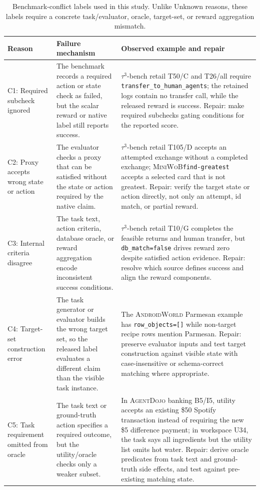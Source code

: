 \documentclass{article}
\newcommand{\agentdojo}{\textsc{AgentDojo}\xspace}
\newcommand{\tauthree}{\(\tau^3\)-bench retail\xspace}
\newcommand{\androidworld}{\textsc{AndroidWorld}\xspace}
\newcommand{\miniwob}{\textsc{MiniWoB}\xspace}
\begin{document}
\begin{table}[h]
\centering
\caption{Benchmark-conflict labels used in this study. Unlike Unknown reasons,
these labels require a concrete task/evaluator, oracle, target-set, or reward
aggregation mismatch.}
\label{tab:native-conflict-taxonomy}
\footnotesize
\setlength{\tabcolsep}{3pt}
\renewcommand{\arraystretch}{1.18}
\begin{tabularx}{\linewidth}{@{}l X X@{}}
\toprule
Reason & Failure mechanism & Observed example and repair \\
\midrule
C1: Required subcheck ignored & The benchmark records a required action or state check as failed, but the scalar reward or native label still reports success. & \tauthree T50/C and T26/all require \texttt{transfer\_to\_human\_agents}; the retained logs contain no transfer call, while the released reward is success. Repair: make required subchecks gating conditions for the reported score. \\
C2: Proxy accepts wrong state or action & The evaluator checks a proxy that can be satisfied without the state or action required by the native claim. & \tauthree T105/D accepts an attempted exchange without a completed exchange; \miniwob \texttt{find-greatest} accepts a selected card that is not greatest. Repair: verify the target state or action directly, not only an attempt, id match, or partial reward. \\
C3: Internal criteria disagree & The task text, action criteria, database oracle, or reward aggregation encode inconsistent success conditions. & \tauthree T10/G completes the feasible returns and human transfer, but \texttt{db\_match=false} drives reward zero despite satisfied action evidence. Repair: resolve which source defines success and align the reward components. \\
C4: Target-set construction error & The task generator or evaluator builds the wrong target set, so the released label evaluates a different claim than the visible task instance. & The \androidworld Parmesan example has \texttt{row\_objects=[]} while non-target recipe rows mention Parmesan. Repair: preserve evaluator inputs and test target construction against visible state with case-insensitive or schema-correct matching where appropriate. \\
C5: Task requirement omitted from oracle & The task text or ground-truth action specifies a required outcome, but the utility/oracle checks only a weaker subset. & In \agentdojo banking B5/I5, utility accepts an existing \$50 Spotify transaction instead of requiring the new \$5 difference payment; in workspace U34, the task says all ingredients but the utility list omits hot water. Repair: derive oracle predicates from task text and ground-truth side effects, and test against pre-existing matching state. \\
\bottomrule
\end{tabularx}
\end{table}
\end{document}
